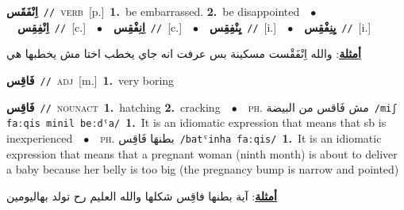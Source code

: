 \documentclass[10pt,a4paper,twoside]{article} %
\begin{document}
\begin{multicols}{2}
{\setlength\topsep{0pt}\textbf{\foreignlanguage{arabic}{اِنْفَقَس}}\ {\color{gray}\texttt{//}\color{black}}\ \textsc{verb}\ [p.]\ \textbf{1.}~be embarrassed.  \textbf{2.}~be disappointed\ \ $\bullet$\ \ \setlength\topsep{0pt}\textbf{\foreignlanguage{arabic}{اِنْفِقِس}}\ {\color{gray}\texttt{//}\color{black}}\ [c.]\ \ $\bullet$\ \ \setlength\topsep{0pt}\textbf{\foreignlanguage{arabic}{اِنِفْقِس}}\ {\color{gray}\texttt{//}\color{black}}\ [c.]\ \ $\bullet$\ \ \setlength\topsep{0pt}\textbf{\foreignlanguage{arabic}{يِنْفِقِس}}\ {\color{gray}\texttt{//}\color{black}}\ [i.]\ \ $\bullet$\ \ \setlength\topsep{0pt}\textbf{\foreignlanguage{arabic}{يِنِفْقِس}}\ {\color{gray}\texttt{//}\color{black}}\ [i.]\  \begin{flushright}\color{gray}\foreignlanguage{arabic}{\textbf{\underline{\foreignlanguage{arabic}{أمثلة}}}: والله اِنْفَقْست مسكينة بس عرفت انه جاي يخطب اختا مش يخطبها هي}\end{flushright}\color{black}} \vspace{2mm}

{\setlength\topsep{0pt}\textbf{\foreignlanguage{arabic}{فَاقِس}}\ {\color{gray}\texttt{//}\color{black}}\ \textsc{adj}\ [m.]\ \textbf{1.}~very boring\ } \vspace{2mm}

{\setlength\topsep{0pt}\textbf{\foreignlanguage{arabic}{فَاقِس}}\ {\color{gray}\texttt{//}\color{black}}\ \textsc{noun\textunderscore act}\ \textbf{1.}~hatching  \textbf{2.}~cracking\ \ $\bullet$\ \ \textsc{ph.} \color{gray} \foreignlanguage{arabic}{مش فَاقس من البيضة}\color{black}\ {\color{gray}\texttt{/{\sffamily miʃ faːqis minil beːdˤa}/}\color{black}}\ \textbf{1.}~It is an idiomatic expression that means that sb is inexperienced\ \ $\bullet$\ \ \textsc{ph.} \color{gray} \foreignlanguage{arabic}{بطنهَا فَاقِس}\color{black}\ {\color{gray}\texttt{/{\sffamily batˤinha faːqis}/}\color{black}}\ \textbf{1.}~It is an idiomatic expression that means that a pregnant woman (ninth month) is about to deliver a baby because her belly is too big (the pregnancy bump is narrow and pointed)\  \begin{flushright}\color{gray}\foreignlanguage{arabic}{\textbf{\underline{\foreignlanguage{arabic}{أمثلة}}}: آية بطنها فاقِس شكلها والله العليم رح تولد بهاليومين}\end{flushright}\color{black}} \vspace{2mm}


\end{multicols}
\end{document}
